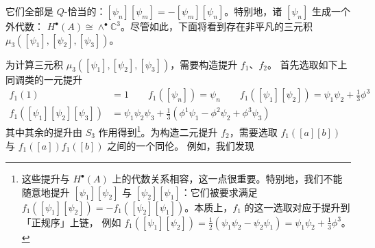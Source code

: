 它们全部是 $Q$-恰当的：$[\psi_n][\psi_m] = -[\psi_m][\psi_n]$。特别地，诸 $[\psi_n]$ 生成一个外代数：
$H^\bullet(A)\cong\wedge^\bullet\mathbb{C}^3$。尽管如此，下面将看到存在非平凡的三元积
$\mu_3([\psi_1],[\psi_2],[\psi_3])$。

为计算三元积 $\mu_3([\psi_1],[\psi_2],[\psi_3])$，需要构造提升 $f_1$、$f_2$。
首先选取如下上同调类的一元提升
\begin{equation}\tag{3.31}
\begin{aligned}
f_1(1) &= 1 \qquad
f_1([\psi_n]) = \psi_n \qquad
f_1([\psi_1][\psi_2]) = \psi_1\psi_2 + \frac{1}{3}\phi^3 \\
f_1([\psi_1][\psi_2][\psi_3]) &= \psi_1\psi_2\psi_3 + \frac{1}{3}\left(\phi^1\psi_1 - \phi^2\psi_2 + \phi^3\psi_3\right)
\end{aligned}
\end{equation}
其中其余的提升由 $S_3$ 作用得到\footnote{%
这些提升与 $H^\bullet(A)$ 上的代数关系相容，这一点很重要。特别地，我们不能随意地提升
$[\psi_1][\psi_2]$ 与 $[\psi_2][\psi_1]$：它们被要求满足
$f_1([\psi_1][\psi_2]) = -f_1([\psi_2][\psi_1])$。本质上，$f_1$ 的这一选取对应于提升到「正规序」上链，
例如 $f_1([\psi_1][\psi_2]) = \frac{1}{2}(\psi_1\psi_2 - \psi_2\psi_1) = \psi_1\psi_2 + \frac{1}{3}\phi^3$。%
}。为构造二元提升 $f_2$，需要选取 $f_1([a][b])$ 与 $f_1([a])f_1([b])$ 之间的一个同伦。
例如，我们发现
